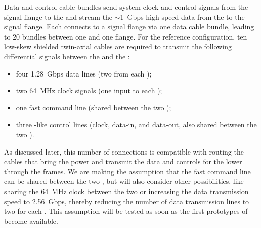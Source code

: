 Data and control cable bundles send system clock and control signals 
from the signal flange to the  and stream the $\sim$\SI{1}{Gbps} 
high-speed data from the  to the signal flange. Each 
 connects to a signal flange via one data cable bundle, 
leading to \num{20} bundles between one  and one flange. 
For the reference  configuration, ten low-skew shielded 
twin-axial cables are required to transmit the following differential signals
between the  and the :
\begin{itemize}
\item four \SI{1.28}{Gbps} data lines (two from each );
\item two \SI{64}{MHz} clock signals (one input to each );
\item one fast command line (shared between the two  );
\item three -like control lines (clock, data-in, and data-out, also shared between the 
two  ).
\end{itemize}
As discussed later, this number of connections is compatible with routing
the cables that bring the power and transmit the data and controls for
the lower  through the  frames. We are making the
assumption that the fast command line can be shared between the two 
 , but will also consider other possibilities,
like sharing the \SI{64}{MHz} clock between the two  or
increasing the data transmission speed to \SI{2.56}{Gbps}, thereby
reducing the number of data transmission lines to two for each .
This assumption will be tested as soon as the first prototypes of
 become available.

